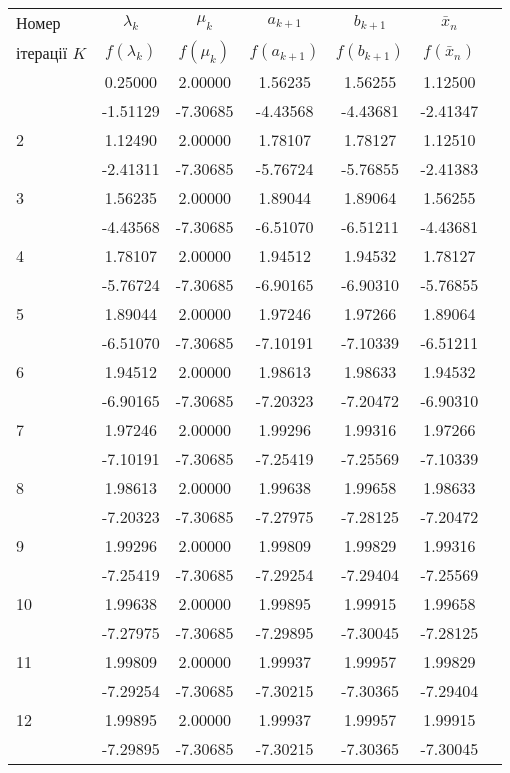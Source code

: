 \documentclass[14pt,a4paper]{extarticle}
\theoremstyle{definition}
\begin{document}
\begin{center}
\begin{longtable}{| l |*6{ c |}}\hline
Номер &$\lambda_k$&$\mu_k$&$a_{k+1}$&$b_{k+1}$&$\bar{x}_n$\\
ітерації $K$&$f(\lambda_k)$&$f(\mu_k)$&$f(a_{k+1})$&$f(b_{k+1})$&$f(\bar{x}_n)$\\\hline
\endfirsthead
\endlastfoot
  1 &  0.25000 &  2.00000 &  1.56235 &  1.56255 &  1.12500 \\*
    & -1.51129 & -7.30685 & -4.43568 & -4.43681 & -2.41347 \\\hline
  2 &  1.12490 &  2.00000 &  1.78107 &  1.78127 &  1.12510 \\*
    & -2.41311 & -7.30685 & -5.76724 & -5.76855 & -2.41383 \\\hline
  3 &  1.56235 &  2.00000 &  1.89044 &  1.89064 &  1.56255 \\*
    & -4.43568 & -7.30685 & -6.51070 & -6.51211 & -4.43681 \\\hline
  4 &  1.78107 &  2.00000 &  1.94512 &  1.94532 &  1.78127 \\*
    & -5.76724 & -7.30685 & -6.90165 & -6.90310 & -5.76855 \\\hline
  5 &  1.89044 &  2.00000 &  1.97246 &  1.97266 &  1.89064 \\*
    & -6.51070 & -7.30685 & -7.10191 & -7.10339 & -6.51211 \\\hline
  6 &  1.94512 &  2.00000 &  1.98613 &  1.98633 &  1.94532 \\*
    & -6.90165 & -7.30685 & -7.20323 & -7.20472 & -6.90310 \\\hline
  7 &  1.97246 &  2.00000 &  1.99296 &  1.99316 &  1.97266 \\*
    & -7.10191 & -7.30685 & -7.25419 & -7.25569 & -7.10339 \\\hline
  8 &  1.98613 &  2.00000 &  1.99638 &  1.99658 &  1.98633 \\*
    & -7.20323 & -7.30685 & -7.27975 & -7.28125 & -7.20472 \\\hline
  9 &  1.99296 &  2.00000 &  1.99809 &  1.99829 &  1.99316 \\*
    & -7.25419 & -7.30685 & -7.29254 & -7.29404 & -7.25569 \\\hline
 10 &  1.99638 &  2.00000 &  1.99895 &  1.99915 &  1.99658 \\*
    & -7.27975 & -7.30685 & -7.29895 & -7.30045 & -7.28125 \\\hline
 11 &  1.99809 &  2.00000 &  1.99937 &  1.99957 &  1.99829 \\*
    & -7.29254 & -7.30685 & -7.30215 & -7.30365 & -7.29404 \\\hline
 12 &  1.99895 &  2.00000 &  1.99937 &  1.99957 &  1.99915 \\*
    & -7.29895 & -7.30685 & -7.30215 & -7.30365 & -7.30045 \\\hline

\end{longtable}
\end{center}
\end{document}

